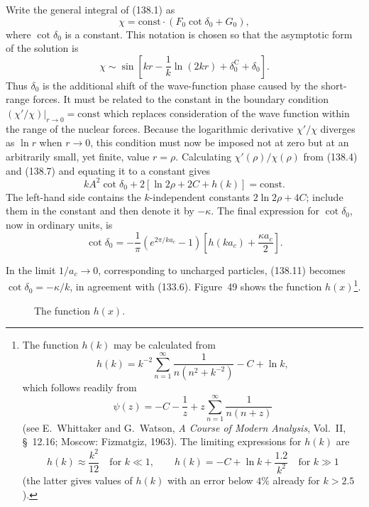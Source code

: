 Write the general integral of (138.1) as
\begin{equation}
 \chi=\mathrm{const}\cdot(F_0\cot\delta_0+G_0),
 \tag{138.9}
\end{equation}
where $\cot\delta_0$ is a constant. This notation is chosen so that the
asymptotic form of the solution is
\begin{equation}
 \chi\sim\sin\left[kr-\frac1k\ln(2kr)+\delta_0^{\mathrm C}+\delta_0\right].
 \tag{138.10}
\end{equation}
Thus $\delta_0$ is the additional shift of the wave-function phase caused by
the short-range forces. It must be related to the constant in the boundary
condition $(\chi'/\chi)|_{r\to0}=\mathrm{const}$ which replaces consideration
of the wave function within the range of the nuclear forces. Because the
logarithmic derivative $\chi'/\chi$ diverges as $\ln r$ when $r\to0$, this
condition must now be imposed not at zero but at an arbitrarily small, yet
finite, value $r=\rho$. Calculating $\chi'(\rho)/\chi(\rho)$ from (138.4) and
(138.7) and equating it to a constant gives
\[
 kA^2\cot\delta_0+2[\ln2\rho+2C+h(k)]=\mathrm{const}.
\]
The left-hand side contains the $k$-independent constants
$2\ln2\rho+4C$; include them in the constant and then denote it by
$-\kappa$. The final expression for $\cot\delta_0$, now in ordinary units,
is
\begin{equation}
 \cot\delta_0=-\frac1\pi(e^{2\pi/ka_c}-1)
 \left[h(ka_c)+\frac{\kappa a_c}{2}\right].
 \tag{138.11}
\end{equation}

In the limit $1/a_c\to0$, corresponding to uncharged particles, (138.11)
becomes $\cot\delta_0=-\kappa/k$, in agreement with (133.6). Figure~49 shows
the function $h(x)$\footnote{The function $h(k)$ may be calculated from
\[
 h(k)=k^{-2}\sum_{n=1}^{\infty}\frac1{n(n^2+k^{-2})}-C+\ln k,
\]
which follows readily from
\[
 \psi(z)=-C-\frac1z+z\sum_{n=1}^{\infty}\frac1{n(n+z)}
\]
(see E.~Whittaker and G.~Watson, \emph{A Course of Modern Analysis}, Vol.~II,
\S~12.16; Moscow: Fizmatgiz, 1963). The limiting expressions for $h(k)$ are
\[
 h(k)\approx\frac{k^2}{12}\quad\text{for }k\ll1,\qquad
 h(k)=-C+\ln k+\frac{1.2}{k^2}\quad\text{for }k\gg1
\]
(the latter gives values of $h(k)$ with an error below $4\%$ already for
$k>2.5$).}.

\begin{figure}[htbp]
\centering
{}
\caption{The function $h(x)$.}
\end{figure}

